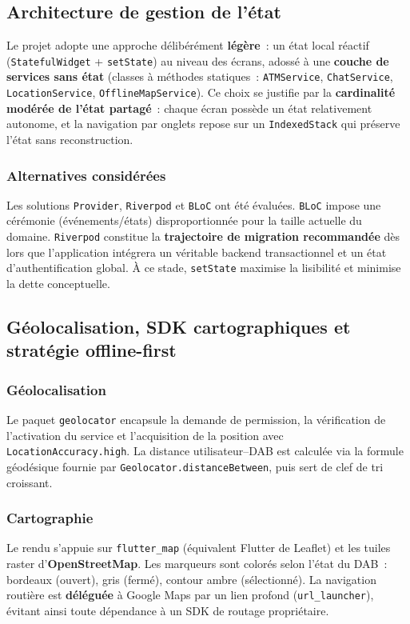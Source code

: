 \documentclass[11pt,a4paper]{article}
\newcommand{\code}[1]{\texttt{#1}}
\begin{document}
\subsection{Architecture de gestion de l'\'etat}
Le projet adopte une approche d\'elib\'er\'ement \textbf{l\'eg\`ere}~: un \'etat
local r\'eactif (\code{StatefulWidget} + \code{setState}) au niveau des \'ecrans,
adoss\'e \`a une \textbf{couche de services sans \'etat} (classes \`a m\'ethodes
statiques~: \code{ATMService}, \code{ChatService}, \code{LocationService},
\code{OfflineMapService}). Ce choix se justifie par la \textbf{cardinalit\'e
mod\'er\'ee de l'\'etat partag\'e}~: chaque \'ecran poss\`ede un \'etat
relativement autonome, et la navigation par onglets repose sur un
\code{IndexedStack} qui pr\'eserve l'\'etat sans reconstruction.

\subsubsection{Alternatives consid\'er\'ees}
Les solutions \code{Provider}, \code{Riverpod} et \code{BLoC} ont \'et\'e
\'evalu\'ees. \code{BLoC} impose une c\'er\'emonie (\'ev\'enements/\'etats)
disproportionn\'ee pour la taille actuelle du domaine. \code{Riverpod}
constitue la \textbf{trajectoire de migration recommand\'ee} d\`es lors que
l'application int\'egrera un v\'eritable backend transactionnel et un \'etat
d'authentification global. \`A ce stade, \code{setState} maximise la lisibilit\'e
et minimise la dette conceptuelle.

\subsection{G\'eolocalisation, SDK cartographiques et strat\'egie offline-first}
\subsubsection{G\'eolocalisation}
Le paquet \code{geolocator} encapsule la demande de permission, la v\'erification
de l'activation du service et l'acquisition de la position avec
\code{LocationAccuracy.high}. La distance utilisateur--DAB est calcul\'ee via la
formule g\'eod\'esique fournie par \code{Geolocator.distanceBetween}, puis sert
de clef de tri croissant.

\subsubsection{Cartographie}
Le rendu s'appuie sur \code{flutter\_map} (\'equivalent Flutter de Leaflet) et
les tuiles raster d'\textbf{OpenStreetMap}. Les marqueurs sont color\'es selon
l'\'etat du DAB~: bordeaux (ouvert), gris (ferm\'e), contour ambre
(s\'electionn\'e). La navigation routi\`ere est \textbf{d\'el\'egu\'ee} \`a
Google Maps par un lien profond (\code{url\_launcher}), \'evitant ainsi toute
d\'ependance \`a un SDK de routage propri\'etaire.
\end{document}
